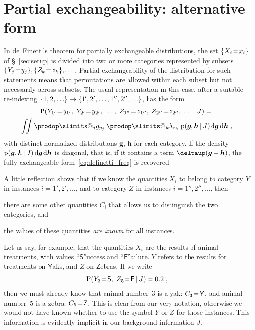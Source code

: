 \documentclass[\ifafour a4paper,12pt,\else a5paper,10pt,\fi%
onecolumn,oneside,article,%
british%
]{memoir}
\makeatletter
\theoremstyle{remark}
\theoremstyle{innote}
\def\prod{\DOTSI\prodop\slimits@}
\newcommand*{\delt}{\deltaup}%
\newcommand*{\di}{\mathrm{d}}%
\DeclarePairedDelimiter\set{\{}{\}}
\newcommand*{\pf}{\mathrm{p}}%
\newcommand*{\p}{\mathrm{P}}%
\renewcommand*{\|}[1][]{\nonscript\,#1\vert\nonscript\,\mathopen{}}
\newcommand*{\sect}{\S}%
\renewcommand*{\=}{\TextOrMath\texteq\eq}
\newcommand*{\X}[1]{X_{#1}}
\newcommand*{\x}[1]{x_{#1}}
\newcommand*{\Y}[1]{Y_{#1}}
\newcommand*{\y}[1]{y_{#1}}
\newcommand*{\Z}[1]{Z_{#1}}
\newcommand*{\z}[1]{z_{#1}}
\newcommand*{\C}[1]{C_{#1}}
\newcommand*{\cc}[1]{c_{#1}}
\newcommand*{\bg}{\bm{g}}
\newcommand*{\bh}{\bm{h}}
\newcommand*{\xs}{\textsf{S}}
\newcommand*{\xf}{\textsf{F}}
\newcommand*{\xY}{\textsf{Y}}
\newcommand*{\xZ}{\textsf{Z}}
\newcommand*{\zI}{J}
\makeatother
\begin{document}
\section{Partial exchangeability: alternative form}
\label{sec:partial_exch}

In de~Finetti's theorem for partially exchangeable distributions, the set
$\set{\X{i}\=\x{i}}$ of \sect~\ref{sec:setup} is divided into two or more
categories represented by subsets
$\set{\Y{j}\=\y{j}}, \set{\Z{k}\=\z{k}}, \dotsc$. Partial exchangeability
of the distribution for such statements means that permutations are allowed
within each subset but not necessarily across subsets. The usual
representation in this case, after a suitable re-indexing
$\set{1,2,\dotsc} \mapsto \set{1', 2', \dotsc, 1'', 2'', \dotsc}$, has the
form
\begin{multline}
  \label{eq:partialdefinetti}
  \p( \Y{1'}\=\y{1'},\; \Y{2'}\=\y{2'},\; \dotsc,\;
  \Z{1''}\=\z{1''},\; \Z{2''}\=\z{2''},\; \dotsc \| \zI) ={}\\
  \iint
  \prod_{j} g_{\y{j}}\;
  \prod_{k} h_{\z{k}}\;
  \pf(\bg,\bh \| \zI)\,\di\bg\,\di\bh \;,
\end{multline}
with distinct normalized distributions $\bg$, $\bh$ for each category. If
the density $\pf(\bg,\bh \| \zI)\,\di\bg\,\di\bh$ is diagonal, that is, if
it contains a term $\delt(\bg-\bh)$, the fully exchangeable
form~\eqref{eq:definetti_freq} is recovered.



A little reflection shows that if we know the quantities $\X{i}$ to belong
to category $Y$ in instances $i=1',2',\dotsc$, and to category $Z$ in
instances $i=1'',2'',\dotsc$, then
\begin{enumerate*}[label=(\alph*)]
\item there are some other quantities $\C{i}$ that allows us to distinguish
  the two categories, and \item the values %
  of these quantities \emph{are known} for all instances.
\end{enumerate*}

Let us say, for example, that the quantities $\X{i}$ are the results of
animal treatments, with values \enquote{$\xs$}uccess and
\enquote{$\xf$}ailure. $Y$ refers to the results for treatments on
$\xY$aks, and $Z$ on $\xZ$ebras. If we write
$$\p(\Y{3}\=\xs,\;\Z{5}\=\xf \| \zI)=0.2\;,$$
then we must already know that animal number~$3$ is a yak: $\C{3}\=\xY$,
and animal number~$5$ is a zebra: $\C{5}\=\xZ$. This is clear from our very
notation, otherwise we would not have known whether to use the symbol $Y$
or $Z$ for those instances. This information is evidently implicit in our
background information $\zI$.
\end{document}
